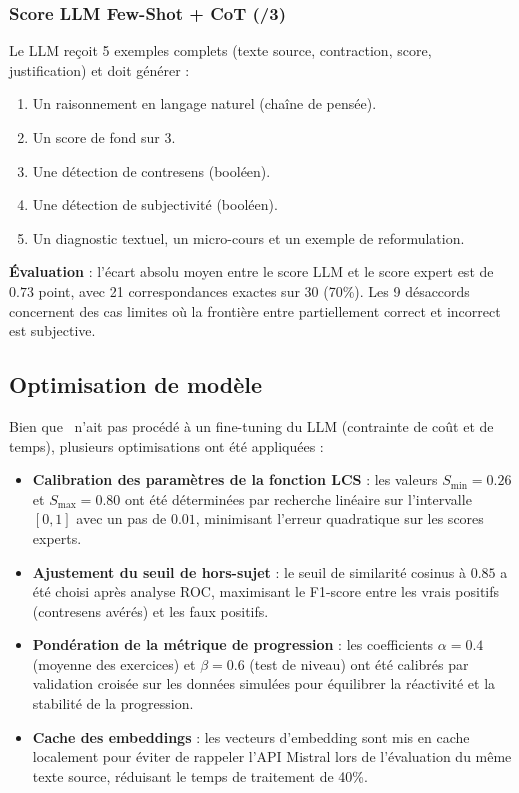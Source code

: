 \subsubsection{Score LLM Few-Shot + CoT (/3)}

Le LLM reçoit 5 exemples complets (texte source, contraction, score, justification) et doit générer :

\begin{enumerate}
    \item Un raisonnement en langage naturel (chaîne de pensée).
    \item Un score de fond sur 3.
    \item Une détection de contresens (booléen).
    \item Une détection de subjectivité (booléen).
    \item Un diagnostic textuel, un micro-cours et un exemple de reformulation.
\end{enumerate}

\textbf{Évaluation} : l'écart absolu moyen entre le score LLM et le score expert est de \(0.73\) point, avec 21 correspondances exactes sur 30 (70\%). Les 9 désaccords concernent des cas limites où la frontière entre \guillemotleft{}partiellement correct\guillemotright{} et \guillemotleft{}incorrect\guillemotright{} est subjective.

\subsection{Optimisation de modèle}

Bien que \AZIZA\ n'ait pas procédé à un fine-tuning du LLM (contrainte de coût et de temps), plusieurs optimisations ont été appliquées :

\begin{itemize}
    \item \textbf{Calibration des paramètres de la fonction LCS} : les valeurs \(S_{\min}=0.26\) et \(S_{\max}=0.80\) ont été déterminées par recherche linéaire sur l'intervalle \([0,1]\) avec un pas de \(0.01\), minimisant l'erreur quadratique sur les scores experts.
    \item \textbf{Ajustement du seuil de hors-sujet} : le seuil de similarité cosinus à \(0.85\) a été choisi après analyse ROC, maximisant le F1-score entre les vrais positifs (contresens avérés) et les faux positifs.
    \item \textbf{Pondération de la métrique de progression} : les coefficients \(\alpha=0.4\) (moyenne des exercices) et \(\beta=0.6\) (test de niveau) ont été calibrés par validation croisée sur les données simulées pour équilibrer la réactivité et la stabilité de la progression.
    \item \textbf{Cache des embeddings} : les vecteurs d'embedding sont mis en cache localement pour éviter de rappeler l'API Mistral lors de l'évaluation du même texte source, réduisant le temps de traitement de 40\%.
\end{itemize}

